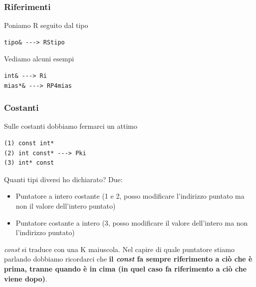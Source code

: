 \documentclass[11pt]{report}
\theoremstyle{definition}
\begin{document}
\subsubsection{Riferimenti}
Poniamo R seguito dal tipo 
\begin{verbatim}
tipo& ---> RStipo
\end{verbatim}
Vediamo alcuni esempi
\begin{verbatim}
int& ---> Ri
mias*& ---> RP4mias
\end{verbatim}
\subsubsection{Costanti}
Sulle costanti dobbiamo fermarci un attimo
\begin{verbatim}
(1) const int*
(2) int const* ---> Pki
(3) int* const 
\end{verbatim}
Quanti tipi diversi ho dichiarato? Due:
\begin{itemize}
\item Puntatore a intero costante (1 e 2, posso modificare l'indirizzo puntato ma non il valore dell'intero puntato)
\item Puntatore costante a intero (3, posso modificare il valore dell'intero ma non l'indirizzo puntato)
\end{itemize}
\emph{const} si traduce con una K maiuscola. Nel capire di quale puntatore stiamo parlando dobbiamo ricordarci che \textbf{il \emph{const} fa sempre riferimento a ciò che è prima, tranne quando è in cima (in quel caso fa riferimento a ciò che viene dopo)}.
\end{document}
